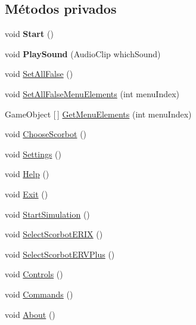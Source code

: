 \subsection*{Métodos privados}
\begin{DoxyCompactItemize}
\item 
\mbox{\label{class_animator_functions_a7e15dae380d6f1416d77dc66c300f099}} 
void {\bfseries Start} ()
\item 
\mbox{\label{class_animator_functions_a017b59718f93c1f614590b09139eaacf}} 
void {\bfseries Play\+Sound} (Audio\+Clip which\+Sound)
\item 
void \mbox{\hyperlink{class_animator_functions_af7c7dc9d64e9329f99a8bef72db57db4}{Set\+All\+False}} ()
\item 
void \mbox{\hyperlink{class_animator_functions_aa757bf3b9943de9bac1a5951b5bd151c}{Set\+All\+False\+Menu\+Elements}} (int menu\+Index)
\item 
Game\+Object \mbox{[}$\,$\mbox{]} \mbox{\hyperlink{class_animator_functions_af53ea51e66124e05ea5f82080d8e2b6c}{Get\+Menu\+Elements}} (int menu\+Index)
\item 
void \mbox{\hyperlink{class_animator_functions_a573963407750082c2ba22b276bc83cdb}{Choose\+Scorbot}} ()
\item 
void \mbox{\hyperlink{class_animator_functions_ab3731a6646ff8ba1174de3e910e0ae0c}{Settings}} ()
\item 
void \mbox{\hyperlink{class_animator_functions_a7cb183fbd7ac3ebb33ae33d67453830b}{Help}} ()
\item 
void \mbox{\hyperlink{class_animator_functions_abbc94844d64966a7d1ad2d3e7cdde3c8}{Exit}} ()
\item 
void \mbox{\hyperlink{class_animator_functions_a22bbcad1e4c262029e07b4203f0f466a}{Start\+Simulation}} ()
\item 
void \mbox{\hyperlink{class_animator_functions_ae71b52412fec20a452c8a617a12614c6}{Select\+Scorbot\+E\+R\+IX}} ()
\item 
void \mbox{\hyperlink{class_animator_functions_af181d9e0d15c90193fda9e8766fb820c}{Select\+Scorbot\+E\+R\+V\+Plus}} ()
\item 
void \mbox{\hyperlink{class_animator_functions_ab5fb7988a9df7571a4a74907a3b29ea5}{Controls}} ()
\item 
void \mbox{\hyperlink{class_animator_functions_a6dba7a70ee964424e91c9817d2edaecc}{Commands}} ()
\item 
void \mbox{\hyperlink{class_animator_functions_a35a71ab86b80ff3826b04f1457e8b573}{About}} ()
\end{DoxyCompactItemize}
